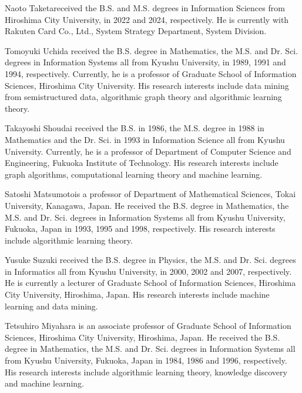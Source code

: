 \profile%
{Naoto Taketa}{received the B.S. and M.S. degrees in Information Sciences from Hiroshima City University, in 2022 and 2024, respectively.
He is currently with Rakuten Card Co., Ltd., System Strategy Department, System Division.}

\profile%
{Tomoyuki Uchida}{ received the B.S. degree in Mathematics, the M.S. 
and Dr. Sci. degrees in Information Systems all from Kyushu
University, in 1989, 1991 and 1994, respectively. Currently,
he is a professor of Graduate School of Information Sciences, Hiroshima City University. 
His research interests include data mining from semistructured data,
algorithmic graph theory and algorithmic learning theory.
}

\profile%
{Takayoshi Shoudai}{ received the B.S. in 1986, the M.S. degree in 1988
in Mathematics and the Dr. Sci. in 1993 in Information Science all
from Kyushu University. Currently, he is a professor of
Department of Computer Science and Engineering, Fukuoka Institute of Technology.
His research interests include graph algorithms, computational learning theory and machine learning.
}

\profile%
{Satoshi Matsumoto}{is a professor of Department of Mathematical Sciences,
Tokai University, Kanagawa, Japan.
He received the B.S. degree in Mathematics, the M.S. and Dr. Sci. degrees in Information Systems 
all from Kyushu University, Fukuoka, Japan in 1993, 1995 and 1998, respectively.
His research interests include algorithmic learning theory.}

\profile%
{Yusuke Suzuki}{ received the B.S. degree in Physics, 
the M.S. and Dr. Sci. degrees in Informatics all from
Kyushu University, 
in 2000, 2002 and 2007, respectively.
He is currently a lecturer of
Graduate School of Information Sciences, Hiroshima City University, Hiroshima, Japan.
His research interests include machine learning and data mining.}

\profile%
{Tetsuhiro Miyahara}{ 
is an associate professor of Graduate School of Information Sciences, 
Hiroshima City University, Hiroshima, Japan. 
He received the B.S. degree in Mathematics, the M.S. and Dr. Sci. degrees 
in Information Systems all from Kyushu University, Fukuoka, Japan in 1984, 
1986 and 1996, respectively. 
His research interests include algorithmic learning theory, knowledge 
discovery and machine learning.}

